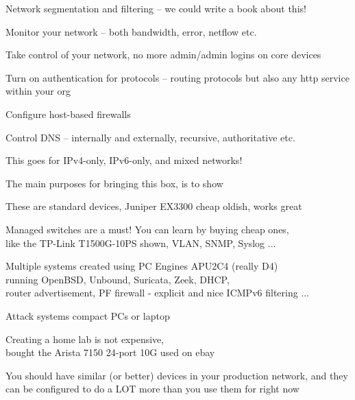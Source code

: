 \documentclass[Screen16to9,17pt]{foils}
\begin{document}
\begin{list2}
\item Network segmentation and filtering -- we could write a book about this! {\myalert}
\item Monitor your network -- both bandwidth, error, netflow etc. {\myalert}
\item Take control of your network, no more admin/admin logins on core devices {\myalert}
\item Turn on authentication for protocols -- routing protocols but also any http service within your org {\myalert}
\item Configure host-based firewalls {\myalert}
\item Control DNS -- internally and externally, recursive, authoritative etc. {\myalert}
\end{list2}

\centerline{This goes for IPv4-only, IPv6-only, and mixed networks!}



The main purposes for bringing this box, is to show
\begin{list2}
\item These are standard devices, Juniper EX3300 cheap oldish, works great
\item Managed switches are a must! You can learn by buying cheap ones,\\
like the TP-Link T1500G-10PS  shown, VLAN, SNMP, Syslog ...
\item Multiple systems created using PC Engines APU2C4 (really D4)\\
running OpenBSD, Unbound, Suricata, Zeek, DHCP, \\
router advertisement, PF firewall - explicit and nice ICMPv6 filtering ...
\item Attack systems compact PCs or laptop
\item Creating a home lab is not expensive, \\
bought the Arista 7150 24-port 10G used on ebay
\end{list2}

You should have similar (or better) devices in your production network, and they can be
configured to do a LOT more than you use them for right now


\end{document}
